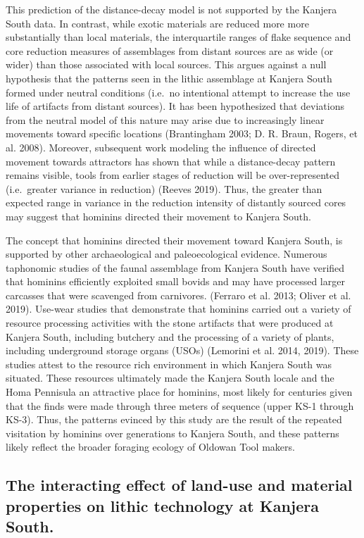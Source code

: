 \documentclass[]{elsarticle} %
\begin{document}
This prediction of the distance-decay model is not supported by the
Kanjera South data. In contrast, while exotic materials are reduced more
more substantially than local materials, the interquartile ranges of
flake sequence and core reduction measures of assemblages from distant
sources are as wide (or wider) than those associated with local sources.
This argues against a null hypothesis that the patterns seen in the
lithic assemblage at Kanjera South formed under neutral conditions
(i.e.~no intentional attempt to increase the use life of artifacts from
distant sources). It has been hypothesized that deviations from the
neutral model of this nature may arise due to increasingly linear
movements toward specific locations (Brantingham 2003; D. R. Braun,
Rogers, et al. 2008). Moreover, subsequent work modeling the influence
of directed movement towards attractors has shown that while a
distance-decay pattern remains visible, tools from earlier stages of
reduction will be over-represented (i.e.~greater variance in reduction)
(Reeves 2019). Thus, the greater than expected range in variance in the
reduction intensity of distantly sourced cores may suggest that hominins
directed their movement to Kanjera South.

The concept that hominins directed their movement toward Kanjera South,
is supported by other archaeological and paleoecological evidence.
Numerous taphonomic studies of the faunal assemblage from Kanjera South
have verified that hominins efficiently exploited small bovids and may
have processed larger carcasses that were scavenged from carnivores.
(Ferraro et al. 2013; Oliver et al. 2019). Use-wear studies that
demonstrate that hominins carried out a variety of resource processing
activities with the stone artifacts that were produced at Kanjera South,
including butchery and the processing of a variety of plants, including
underground storage organs (USOs) (Lemorini et al. 2014, 2019). These
studies attest to the resource rich environment in which Kanjera South
was situated. These resources ultimately made the Kanjera South locale
and the Homa Pennisula an attractive place for hominins, most likely for
centuries given that the finds were made through three meters of
sequence (upper KS-1 through KS-3). Thus, the patterns evinced by this
study are the result of the repeated visitation by hominins over
generations to Kanjera South, and these patterns likely reflect the
broader foraging ecology of Oldowan Tool makers.

\hypertarget{the-interacting-effect-of-land-use-and-material-properties-on-lithic-technology-at-kanjera-south.}{%
\subsection{The interacting effect of land-use and material properties
on lithic technology at Kanjera
South.}\label{the-interacting-effect-of-land-use-and-material-properties-on-lithic-technology-at-kanjera-south.}}
\end{document}
